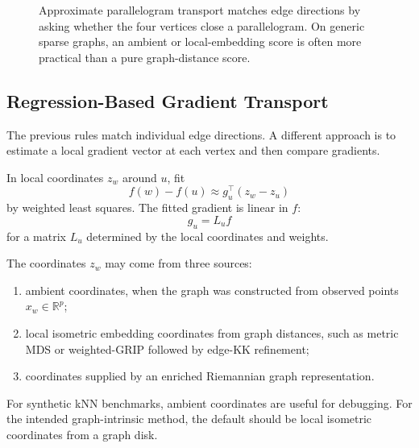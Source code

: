 \documentclass[11pt]{article}
\newcommand{\R}{\mathbb R}
\begin{document}
\begin{figure}[ht]
\centering
{}
\caption{Approximate parallelogram transport matches edge directions by
asking whether the four vertices close a parallelogram.  On generic sparse
graphs, an ambient or local-embedding score is often more practical than a
pure graph-distance score.}
\end{figure}

\subsection{Regression-Based Gradient Transport}

The previous rules match individual edge directions.  A different approach is
to estimate a local gradient vector at each vertex and then compare gradients.

In local coordinates \(z_w\) around \(u\), fit
\[
  f(w)-f(u)
  \approx
  g_u^\top(z_w-z_u)
\]
by weighted least squares.  The fitted gradient is linear in \(f\):
\[
  g_u = L_u f
\]
for a matrix \(L_u\) determined by the local coordinates and weights.

The coordinates \(z_w\) may come from three sources:
\begin{enumerate}[label=(\roman*),leftmargin=*]
  \item ambient coordinates, when the graph was constructed from observed
  points \(x_w\in\R^p\);
  \item local isometric embedding coordinates from graph distances, such as
  metric MDS or weighted-GRIP followed by edge-KK refinement;
  \item coordinates supplied by an enriched Riemannian graph representation.
\end{enumerate}
For synthetic kNN benchmarks, ambient coordinates are useful for debugging.
For the intended graph-intrinsic method, the default should be local isometric
coordinates from a graph disk.
\end{document}
